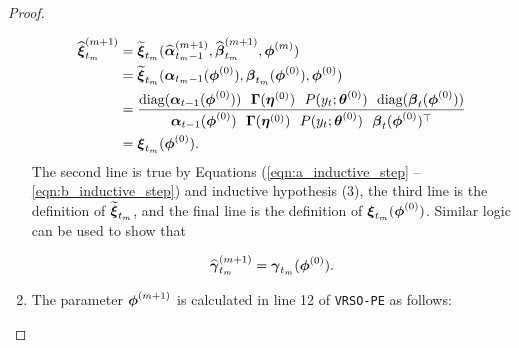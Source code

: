 \begin{proof}
\begin{enumerate}
        \begin{align}
            \widehat {\boldsymbol{\xi}}^{(m+1)}_{t_m} &= \widetilde {\boldsymbol{\xi}}_{t_m}(\widehat {\boldsymbol{\alpha}}^{(m+1)}_{t_m-1},\widehat {\boldsymbol{\beta}}^{(m+1)}_{t_m}, \boldsymbol{\phi}^{(m)}) \nonumber \\
            &= \widetilde {\boldsymbol{\xi}}_{t_m}(\boldsymbol{\alpha}_{t_m-1}(\boldsymbol{\phi}^{(0)}),\boldsymbol{\beta}_{t_m}(\boldsymbol{\phi}^{(0)}), \boldsymbol{\phi}^{(0)}) \nonumber  \\
            &= \frac{\text{diag}(\boldsymbol{\alpha}_{t-1}(\boldsymbol{\phi}^{(0)})) ~~ \boldsymbol{\Gamma}(\boldsymbol{\eta}^{(0)}) ~~ P(y_t;\boldsymbol{\theta}^{(0)}) ~~ \text{diag}(\boldsymbol{\beta}_t(\boldsymbol{\phi}^{(0)}))}{\boldsymbol{\alpha}_{t-1}(\boldsymbol{\phi}^{(0)}) ~~ \boldsymbol{\Gamma}(\boldsymbol{\eta}^{(0)}) ~~ P(y_{t};\boldsymbol{\theta}^{(0)}) ~~ \boldsymbol{\beta}_{t}(\boldsymbol{\phi}^{(0)})^\top} \nonumber  \\
            &= \boldsymbol{\xi}_{t_m}(\boldsymbol{\phi}^{(0)}). \label{eqn:g_inductive_step}
        \end{align}
        The second line is true by Equations (\ref{eqn:a_inductive_step} -- \ref{eqn:b_inductive_step}) and inductive hypothesis (3), the third line is the definition of $\widetilde {\boldsymbol{\xi}}_{t_m}$, and the final line is the definition of $\boldsymbol{\xi}_{t_m}(\boldsymbol{\phi}^{(0)})$. Similar logic can be used to show that 
        
        \begin{equation}
            \widehat {\boldsymbol{\gamma}}^{(m+1)}_{t_m} = \boldsymbol{\gamma}_{t_m}(\boldsymbol{\phi}^{(0)}). \label{eqn:x_inductive_step}
        \end{equation}
        \item The parameter $\boldsymbol{\phi}^{(m+1)}$ is calculated in line 12 of \texttt{VRSO-PE} as follows: 
        

\end{enumerate}
\end{proof}
